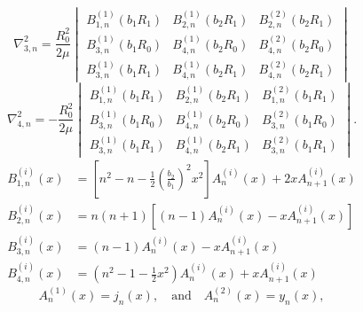\begin{equation*}
	\nabla^2_{3,n} = \frac{R_0^2}{2\mu}\begin{vmatrix}
		B_{1,n}^{(1)}(b_1 R_1) & B_{2,n}^{(1)}(b_2 R_1) & B_{2,n}^{(2)}(b_2 R_1)\\
		B_{3,n}^{(1)}(b_1 R_0) & B_{4,n}^{(1)}(b_2 R_0) & B_{4,n}^{(2)}(b_2 R_0)\\
		B_{3,n}^{(1)}(b_1 R_1) & B_{4,n}^{(1)}(b_2 R_1) & B_{4,n}^{(2)}(b_2 R_1)
	\end{vmatrix}
\end{equation*}
\begin{equation*}
	\nabla^2_{4,n} = -\frac{R_0^2}{2\mu}\begin{vmatrix}
		B_{1,n}^{(1)}(b_1 R_1) & B_{2,n}^{(1)}(b_2 R_1) & B_{1,n}^{(2)}(b_1 R_1)\\
		B_{3,n}^{(1)}(b_1 R_0) & B_{4,n}^{(1)}(b_2 R_0) & B_{3,n}^{(2)}(b_1 R_0)\\
		B_{3,n}^{(1)}(b_1 R_1) & B_{4,n}^{(1)}(b_2 R_1) & B_{3,n}^{(2)}(b_1 R_1)
	\end{vmatrix}.
\end{equation*}
\begin{align*}
	B_{1,n}^{(i)}(x) &= \left[n^2-n-\frac{1}{2}\left(\frac{b_2}{b_1}\right)^2 x^2\right] A_n^{(i)}(x) + 2xA_{n+1}^{(i)}(x)\\
	B_{2,n}^{(i)}(x) &= n(n+1)\left[(n-1)A_n^{(i)}(x) - xA_{n+1}^{(i)}(x)\right]\\
	B_{3,n}^{(i)}(x) &= (n-1) A_n^{(i)}(x) - xA_{n+1}^{(i)}(x)\\
	B_{4,n}^{(i)}(x) &= \left(n^2-1-\frac{1}{2}x^2\right) A_n^{(i)}(x) + xA_{n+1}^{(i)}(x)
\end{align*}
\begin{equation*}
	A_{n}^{(1)}(x) = j_n(x),\quad\text{and}\quad A_{n}^{(2)}(x) = y_n(x),
\end{equation*}
